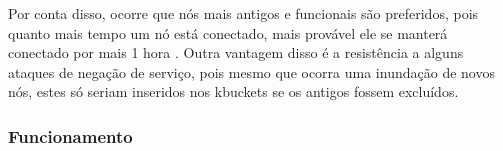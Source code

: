 Por conta disso, ocorre que nós mais antigos e funcionais são preferidos, pois quanto
mais tempo um nó está conectado, mais provável ele se manterá conectado por mais 1 hora
\cite{artigo:gnutella-uptime}. Outra vantagem disso é a resistência a alguns ataques de
negação de serviço, pois mesmo que ocorra uma inundação de novos nós, estes só seriam
inseridos nos \glspl*{kbucket} se os antigos fossem excluídos.

\subsubsection*{Funcionamento}




